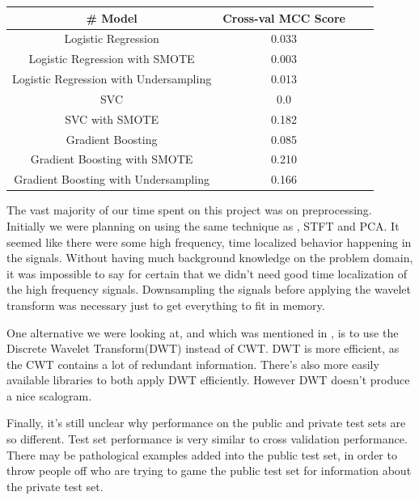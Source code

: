 \documentclass{article}
\begin{document}
\begin{center}
\begin{tabular}{ |c|c|c|c| } 
\hline
\# Model & Cross-val MCC Score \\
\hline
Logistic Regression & 0.033 \\ 
Logistic Regression with SMOTE & 0.003 \\
Logistic Regression with Undersampling & 0.013 \\
SVC & 0.0 \\
SVC with SMOTE & 0.182 \\
Gradient Boosting & 0.085 \\
Gradient Boosting with SMOTE & 0.210 \\
Gradient Boosting with Undersampling & 0.166 \\
\hline
\end{tabular}
\end{center}


The vast majority of our time spent on this project was on preprocessing.
Initially we were planning on using the same technique as \cite{hw4b}, STFT and
PCA. It seemed like there were some high frequency, time localized behavior
happening in the signals. Without having much background knowledge on the
problem domain, it was impossible to say for certain that we didn't need good
time localization of the high frequency signals. Downsampling the signals before
applying the wavelet transform was necessary just to get everything to fit in
memory.

One alternative we were looking at, and which was mentioned in \cite{article}, is
to use the Discrete Wavelet Transform(DWT) instead of CWT. DWT is
more efficient, as the CWT contains a lot of redundant information. There's also more
easily available libraries to both apply DWT efficiently. However DWT doesn't
produce a nice scalogram.

Finally, it's still unclear why performance on the public and private test sets
are so different. Test set performance is very similar to cross validation
performance. There may be pathological examples added into the public test set,
in order to throw people off who are trying to game the public test set for
information about the private test set.


\FloatBarrier
\printbibliography
\end{document}
